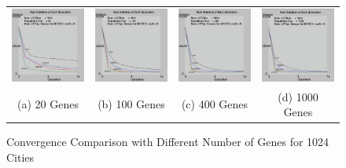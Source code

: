 \begin{figure}
\centering
\begin{tabular}{cccc}
\includegraphics[width=4.3cm]{images/conv1024_20.jpg} &
\includegraphics[width=4.3cm]{images/conv1024_100.jpg} & 
\includegraphics[width=4.3cm]{images/conv1024_400.jpg} &
\includegraphics[width=4.3cm]{images/conv1024_1000.jpg} \\
(a) 20 Genes  & (b) 100 Genes & (c) 400 Genes & (d) 1000 Genes
\end{tabular}
\caption{Convergence Comparison with Different Number of Genes for 1024 Cities}
\label{fig:ConvergenceWithDifferentGenes}
\end{figure}


